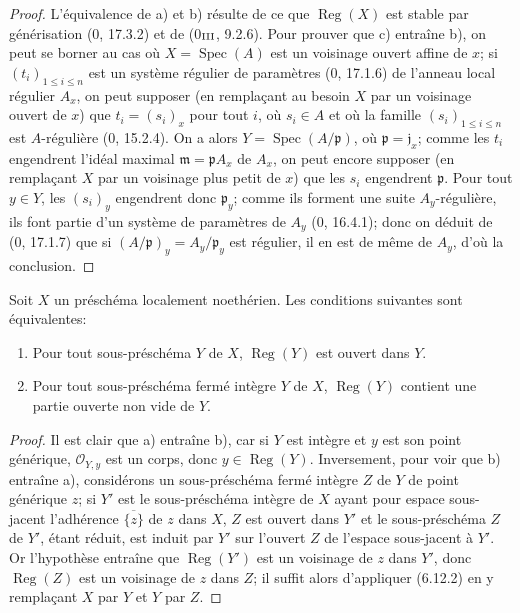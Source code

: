 \begin{proof}
L'équivalence de a) et b) résulte de ce que $\operatorname{Reg}(X)$ est
stable par générisation (0, 17.3.2) et de (0$_{\rm III}$, 9.2.6). Pour
prouver que c) entraîne b), on peut se borner au cas où
$X=\operatorname{Spec}(A)$ est un voisinage ouvert affine de $x$; si
$(t_i)_{1\leq i\leq n}$ est un système régulier de paramètres (0, 17.1.6)
de l'anneau local régulier $A_x$, on peut supposer (en remplaçant au besoin
$X$ par un voisinage ouvert de $x$) que $t_i=(s_i)_x$ pour tout $i$, où
$s_i\in A$ et où la famille $(s_i)_{1\leq i\leq n}$ est $A$-régulière
(0, 15.2.4). On a alors $Y=\operatorname{Spec}(A/\mathfrak p)$, où
$\mathfrak p=\mathfrak j_x$; comme les $t_i$ engendrent l'idéal maximal
$\mathfrak m=\mathfrak pA_x$ de $A_x$, on peut encore supposer (en
remplaçant $X$ par un voisinage plus petit de $x$) que les $s_i$ engendrent
$\mathfrak p$. Pour tout $y\in Y$, les $(s_i)_y$ engendrent donc
$\mathfrak p_y$; comme ils forment une suite $A_y$-régulière, ils font
partie d'un système de paramètres de $A_y$ (0, 16.4.1); donc on déduit de
(0, 17.1.7) que si $(A/\mathfrak p)_y=A_y/\mathfrak p_y$ est régulier, il
en est de même de $A_y$, d'où la conclusion.
\end{proof}

\begin{corollary}[6.12.3]
\label{IV.2.s6.12.3-fr}
Soit $X$ un préschéma localement noethérien. Les conditions suivantes sont
équivalentes:
\begin{enumerate}
\item[a)] Pour tout sous-préschéma $Y$ de $X$,
$\operatorname{Reg}(Y)$ est ouvert dans $Y$.


\item[b)] Pour tout sous-préschéma fermé intègre $Y$ de $X$,
$\operatorname{Reg}(Y)$ contient une partie ouverte non vide de $Y$.
\end{enumerate}
\end{corollary}

\begin{proof}
Il est clair que a) entraîne b), car si $Y$ est intègre et $y$ est son point
générique, $\mathcal O_{Y,y}$ est un corps, donc $y\in\operatorname{Reg}(Y)$.
Inversement, pour voir que b) entraîne a), considérons un sous-préschéma
fermé intègre $Z$ de $Y$ de point générique $z$; si $Y'$ est le
sous-préschéma intègre de $X$ ayant pour espace sous-jacent l'adhérence
$\overline{\{z\}}$ de $z$ dans $X$, $Z$ est ouvert dans $Y'$ et le
sous-préschéma $Z$ de $Y'$, étant réduit, est induit par $Y'$ sur l'ouvert
$Z$ de l'espace sous-jacent à $Y'$. Or l'hypothèse entraîne que
$\operatorname{Reg}(Y')$ est un voisinage de $z$ dans $Y'$, donc
$\operatorname{Reg}(Z)$ est un voisinage de $z$ dans $Z$; il suffit alors
d'appliquer (6.12.2) en y remplaçant $X$ par $Y$ et $Y$ par $Z$.
\end{proof}

